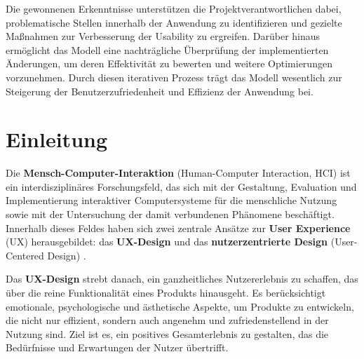\documentclass[12pt,oneside]{article}
\begin{document}
Die gewonnenen Erkenntnisse unterstützen die Projektverantwortlichen dabei, problematische Stellen innerhalb der Anwendung zu identifizieren und gezielte Maßnahmen zur Verbesserung der Usability zu ergreifen. Darüber hinaus ermöglicht das Modell eine nachträgliche Überprüfung der implementierten Änderungen, um deren Effektivität zu bewerten und weitere Optimierungen vorzunehmen. Durch diesen iterativen Prozess trägt das Modell wesentlich zur Steigerung der Benutzerzufriedenheit und Effizienz der Anwendung bei.

\tableofcontents
 
 
\begin{acronym}[hyperlinks]
\end{acronym}

\section{Einleitung}

Die \textbf{Mensch-Computer-Interaktion} (Human-Computer Interaction, HCI) ist ein interdisziplinäres Forschungsfeld, das sich mit der Gestaltung, Evaluation und Implementierung interaktiver Computersysteme für die menschliche Nutzung sowie mit der Untersuchung der damit verbundenen Phänomene beschäftigt. Innerhalb dieses Feldes haben sich zwei zentrale Ansätze zur \textbf{User Experience} (UX) herausgebildet: das \textbf{UX-Design} und das \textbf{nutzerzentrierte Design} (User-Centered Design) \cite{glanznig}.

Das \textbf{UX-Design} strebt danach, ein ganzheitliches Nutzererlebnis zu schaffen, das über die reine Funktionalität eines Produkts hinausgeht. Es berücksichtigt emotionale, psychologische und ästhetische Aspekte, um Produkte zu entwickeln, die nicht nur effizient, sondern auch angenehm und zufriedenstellend in der Nutzung sind. Ziel ist es, ein positives Gesamterlebnis zu gestalten, das die Bedürfnisse und Erwartungen der Nutzer übertrifft.
\end{document}
